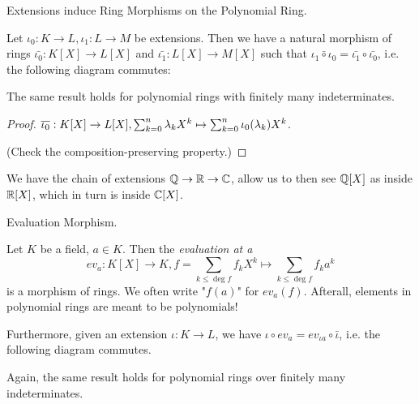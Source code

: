 \documentclass[../book.tex]{subfiles}
\begin{document}
\begin{lem} Extensions induce Ring Morphisms on the Polynomial Ring. 

    Let $\iota_0 : K \to L, \iota_1 : L \to M$ be extensions. 
    Then we have a natural morphism of rings $\bar{\iota_0} : K[X] \to L[X]$
    and $\bar{\iota_1} : L[X] \to M[X]$ such that 
    $\bar{\iota_1 \circ \iota_0} = \bar{\iota_1} \circ \bar{\iota_0}$,
    i.e. the following diagram commutes: 
    \begin{figure}[ht]
        \centering
        \label{fig:polyring_functor}
    \end{figure}

    The same result holds for polynomial rings 
    with finitely many indeterminates.
\end{lem}
\begin{proof}
    $\overline{\iota_0} : K[X] \to L[X], 
    \sum_{k=0}^n \lambda_kX^k \mapsto \sum_{k = 0}^n \iota_0(\lambda_k)X^k$. 
    
    (Check the composition-preserving property.)
\end{proof}
\begin{eg}

    We have the chain of extensions $\mathbb{Q} \to \mathbb{R} \to \mathbb{C}$,
    allow us to then see $\mathbb{Q}[X]$ as inside $\mathbb{R}[X]$,
    which in turn is inside $\mathbb{C}[X]$.
\end{eg}
\begin{lem} Evaluation Morphism. 

    Let $K$ be a field, $a \in K$. 
    Then the \emph{evaluation at a} 
    \[ev_a : K[X] \to K, 
    f = \sum_{k \leq \deg f} f_k X^k \mapsto \sum_{k\leq\deg f} f_k a^k\]
    is a morphism of rings. 
    We often write "$f(a)$" for $ev_a (f)$. 
    Afterall, elements in polynomial rings are meant to be polynomials! 

    Furthermore, given an extension $\iota : K \to L$, 
    we have $\iota \circ ev_a = ev_{\iota a} \circ \bar{\iota}$,
    i.e. the following diagram commutes. 
    \begin{figure}[ht]
        \centering
    \label{fig:ev}
    \end{figure}

    Again, the same result holds for polynomial rings 
    over finitely many indeterminates. 
\end{lem}
\end{document}
